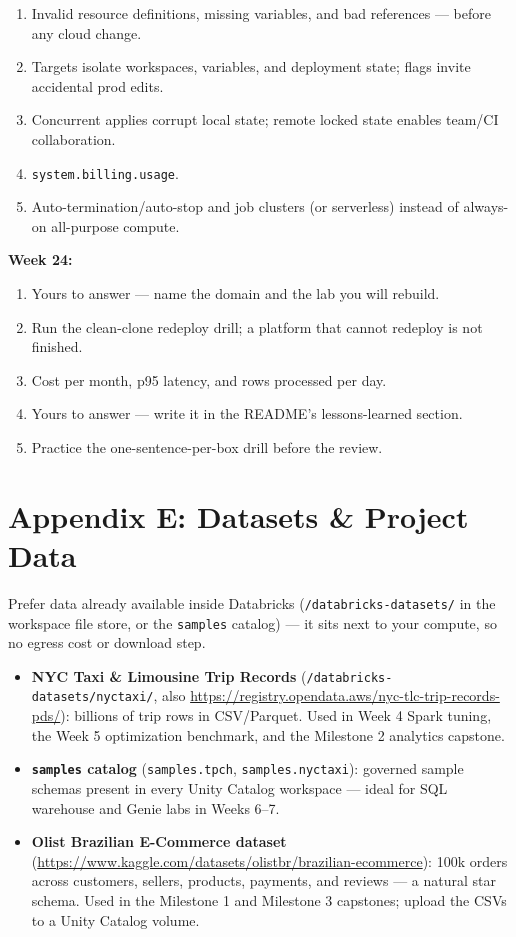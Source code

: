 \documentclass[11pt, a4paper]{article}
\begin{document}
\begin{enumerate}[itemsep=0pt, leftmargin=2em]
    \item Invalid resource definitions, missing variables, and bad references --- before any cloud change.
    \item Targets isolate workspaces, variables, and deployment state; flags invite accidental prod edits.
    \item Concurrent applies corrupt local state; remote locked state enables team/CI collaboration.
    \item \texttt{system.billing.usage}.
    \item Auto-termination/auto-stop and job clusters (or serverless) instead of always-on all-purpose compute.
\end{enumerate}
\noindent\textbf{Week 24:}
\begin{enumerate}[itemsep=0pt, leftmargin=2em]
    \item Yours to answer --- name the domain and the lab you will rebuild.
    \item Run the clean-clone redeploy drill; a platform that cannot redeploy is not finished.
    \item Cost per month, p95 latency, and rows processed per day.
    \item Yours to answer --- write it in the README's lessons-learned section.
    \item Practice the one-sentence-per-box drill before the review.
\end{enumerate}

\section{Appendix E: Datasets \& Project Data}
Prefer data already available inside Databricks (\texttt{/databricks-datasets/} in the workspace file store, or the \texttt{samples} catalog) --- it sits next to your compute, so no egress cost or download step.

\begin{itemize}[label=-]
    \item \textbf{NYC Taxi \& Limousine Trip Records} (\texttt{/databricks-datasets/nyctaxi/}, also \url{https://registry.opendata.aws/nyc-tlc-trip-records-pds/}): billions of trip rows in CSV/Parquet. Used in Week 4 Spark tuning, the Week 5 optimization benchmark, and the Milestone 2 analytics capstone.
    \item \textbf{\texttt{samples} catalog} (\texttt{samples.tpch}, \texttt{samples.nyctaxi}): governed sample schemas present in every Unity Catalog workspace --- ideal for SQL warehouse and Genie labs in Weeks 6--7.
    \item \textbf{Olist Brazilian E-Commerce dataset} (\url{https://www.kaggle.com/datasets/olistbr/brazilian-ecommerce}): 100k orders across customers, sellers, products, payments, and reviews --- a natural star schema. Used in the Milestone 1 and Milestone 3 capstones; upload the CSVs to a Unity Catalog volume.
\end{itemize}
\end{document}
